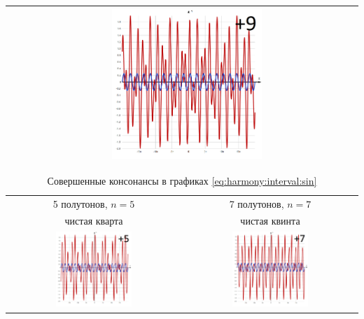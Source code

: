 \begin{table}[!ht]
\begin{tabular}{c|c}
            & \includegraphics[width=0.45\textwidth]{fig/intervals/i09} \\
        \hline\hline
    \end{tabular}
\end{table}

\begin{table}[!ht]
    \caption{Совершенные консонансы в графиках \eqref{eq:harmony:interval:sin}}
    \label{t:harmony:interval:conso-5-7}
    \centering
    \begin{tabular}{c|c}
        \hline\hline
        5 полутонов, $n=5$  & 7 полутонов, $n=7$ \\
        чистая кварта       & чистая квинта \\
        \includegraphics[width=0.45\textwidth]{fig/intervals/i05} 
            & \includegraphics[width=0.45\textwidth]{fig/intervals/i07} \\
        \hline\hline
    \end{tabular}
\end{table}

